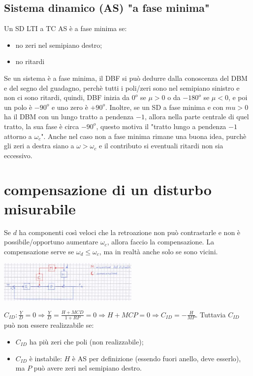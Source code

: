    \subsection{Sistema dinamico (AS) "a fase minima"}
    Un SD LTI a TC AS è a fase minima se:
    \begin{itemize}
        \item no zeri nel semipiano destro;
        \item no ritardi
    \end{itemize}
    Se un sistema è a fase minima, il DBF si può dedurre dalla conoscenza del DBM e del segno del guadagno, perchè tutti i poli/zeri sono nel semipiano sinistro e non ci sono ritardi, quindi, DBF inizia da $0^o$ se $\mu> 0$ o da $-180^o$ se $\mu< 0$, e poi un polo è $-90^o$ e uno zero è $+ 90^o$.\newline
    Inoltre, se un SD a fase minima e con $mu > 0$ ha il DBM con un lungo tratto a pendenza $-1$, allora nella parte centrale di quel tratto, la sua fase è circa $-90^o$, questo motiva il "tratto lungo a pendenza $-1$ attorno a $\omega_c$".\newline
    Anche nel caso non a fase minima rimane una buona idea, purchè gli zeri a destra siano a $\omega > \omega_c$ e il contributo si eventuali ritardi non sia eccessivo.
    \newpage\section{compensazione di un disturbo misurabile}
    Se $d$ ha componenti così veloci che la retroazione non può contrastarle e non è possibile/opportuno aumentare $\omega_c$, allora faccio la compensazione. \newline
    La compensazione serve se $\omega_d \leq \omega_c$, ma in realtà anche solo se sono vicini.
    \begin{center}
        \includegraphics[height=2cm]{../formulario/img4.JPG}
    \end{center}
    $C_{ID}: \frac{Y}{D} = 0 \Rightarrow \frac{Y}{D} = \frac{H + MCD}{1+RP} = 0 \Rightarrow H + MCP = 0 \Rightarrow C_{ID} = - \frac{H}{MP}$.\newline
    Tuttavia $C_{ID}$ può non essere realizzabile se:
    \begin{itemize}
        \item $C_{ID}$ ha più zeri che poli (non realizzabile);
        \item $C_{ID}$ è instabile: $H$ è AS per definizione (essendo fuori anello, deve esserlo), ma $P$ può avere zeri nel semipiano destro.
    \end{itemize} 
